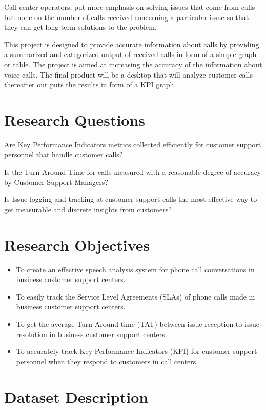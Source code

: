 \documentclass[conference]{IEEEtran}
\begin{document}
Call center operators, put more emphasis on solving issues that come from calls but none on the number of calls received concerning a particular issue so that they can get long term solutions to the problem.

This project is designed to provide accurate information about calls by providing a summarized and categorized output of received calls in form of a simple graph or table. The project is aimed at increasing the accuracy of the information about voice calls. The final product will be a desktop that will analyze customer calls thereafter out puts the results in form of a KPI graph.


\section{Research Questions}
Are Key Performance Indicators metrics collected efficiently for customer support personnel that handle customer calls?

Is the Turn Around Time for calls measured with a reasonable degree of accuracy by Customer Support Managers?

Is Issue logging and tracking at customer support calls the most effective way to get measurable and discrete insights from customers?

\section{Research Objectives}
\begin{itemize}
\item To create an effective speech analysis system for phone call conversations in business customer support centers.
\item To easily track the Service Level Agreements (SLAs) of phone calls made in business customer support centers.
\item To get the average Turn Around time (TAT) between issue reception to issue resolution in business customer support centers.
\item To accurately track Key Performance Indicators (KPI) for customer support personnel when they respond to customers in call centers.
\end{itemize}

\section{Dataset Description}
\end{document}
